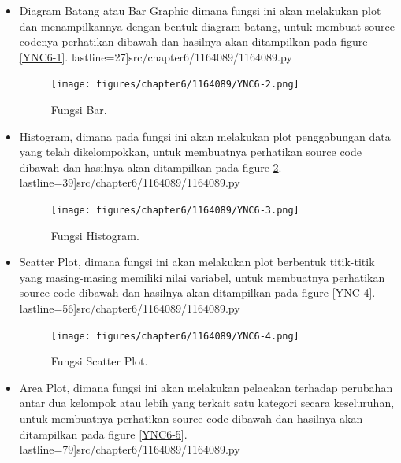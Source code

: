 \begin{enumerate}
	\begin{itemize}

		\item Diagram Batang atau Bar Graphic dimana fungsi ini akan melakukan plot dan menampilkannya dengan bentuk diagram 			         batang, untuk membuat source codenya perhatikan dibawah dan hasilnya akan ditampilkan pada figure \ref{YNC6-1}.
		          lastline=27]{src/chapter6/1164089/1164089.py}

			\begin{figure}[!htbp!]
				\centerline{\texttt{[image: figures/chapter6/1164089/YNC6-2.png]}}
				\caption{Fungsi Bar.}
				\label{YNC6-2}
			\end{figure}

		\item Histogram, dimana pada fungsi ini akan melakukan plot penggabungan data yang telah dikelompokkan, untuk 				         membuatnya perhatikan source code dibawah dan hasilnya akan ditampilkan pada figure \ref{YNC6-3}.
		          lastline=39]{src/chapter6/1164089/1164089.py}

			\begin{figure}[!htbp!]
				\centerline{\texttt{[image: figures/chapter6/1164089/YNC6-3.png]}}
				\caption{Fungsi Histogram.}
				\label{YNC6-3}
			\end{figure}

		\item Scatter Plot, dimana fungsi ini akan melakukan plot berbentuk titik-titik yang masing-masing memiliki nilai variabel, 				         untuk membuatnya perhatikan source code dibawah dan hasilnya akan ditampilkan pada figure \ref{YNC-4}.
		         lastline=56]{src/chapter6/1164089/1164089.py}

		        \begin{figure}[!htbp!]
				\centerline{\texttt{[image: figures/chapter6/1164089/YNC6-4.png]}}
				\caption{Fungsi Scatter Plot.}
				\label{YNC6-4}
			\end{figure}

		\item Area Plot, dimana fungsi ini akan melakukan pelacakan terhadap perubahan antar dua kelompok atau lebih yang 				         terkait satu kategori secara keseluruhan, untuk membuatnya perhatikan source code dibawah dan hasilnya akan 				         ditampilkan pada figure \ref{YNC6-5}.
		         lastline=79]{src/chapter6/1164089/1164089.py}


\end{itemize}
\end{enumerate}
